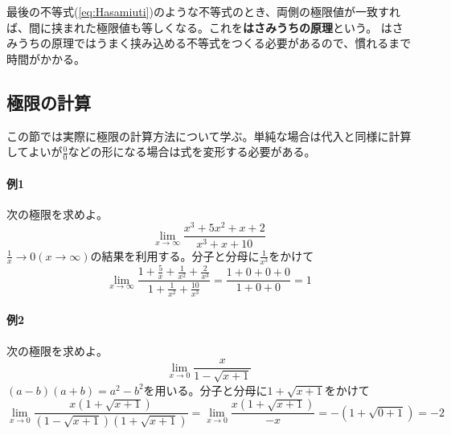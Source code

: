 \documentclass[a4j,dvipdfmx]{jsarticle}
\begin{document}
                最後の不等式(\ref{eq:Hasamiuti})のような不等式のとき、両側の極限値が一致すれば、間に挟まれた極限値も等しくなる。これを\textbf{はさみうちの原理}という。
                はさみうちの原理ではうまく挟み込める不等式をつくる必要があるので、慣れるまで時間がかかる。

            \clearpage
            \subsection{極限の計算}
                この節では実際に極限の計算方法について学ぶ。単純な場合は代入と同様に計算してよいが$\frac{0}{0}$などの形になる場合は式を変形する必要がある。

                \paragraph{例1}次の極限を求めよ。
                    \begin{equation*}
                        \lim_{x\to \infty}\frac{x^3+5x^2+x+2}{x^3+x+10}
                    \end{equation*}
                    $\frac{1}{x}\to 0(x\to \infty)$の結果を利用する。分子と分母に$\frac{1}{x^3}$をかけて
                    \begin{equation*}
                        \lim_{x\to \infty}\frac{1+\frac{5}{x}+\frac{1}{x^2}+\frac{2}{x^3}}{1+\frac{1}{x^2}+\frac{10}{x^3}}=\frac{1+0+0+0}{1+0+0}=1
                    \end{equation*}
                
                \paragraph{例2}次の極限を求めよ。
                    \begin{equation*}
                        \lim_{x\to 0}\frac{x}{1-\sqrt{x+1}}
                    \end{equation*}
                    $(a-b)(a+b)=a^2-b^2$を用いる。分子と分母に$1+\sqrt{x+1}$をかけて
                    \begin{equation*}
                        \lim_{x\to 0}\frac{x(1+\sqrt{x+1})}{(1-\sqrt{x+1})(1+\sqrt{x+1})}=\lim_{x\to 0}\frac{x(1+\sqrt{x+1})}{-x}=-(1+\sqrt{0+1})=-2
                    \end{equation*}
                
\end{document}
